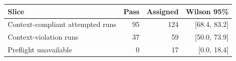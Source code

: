 \begin{tabular}{lrrr}
\toprule
\textbf{Slice} & \textbf{Pass} & \textbf{Assigned} & \textbf{Wilson 95\%} \\
\midrule
Context-compliant attempted runs & 95 & 124 & [68.4, 83.2] \\
Context-violation runs & 37 & 59 & [50.0, 73.9] \\
Preflight unavailable & 0 & 17 & [0.0, 18.4] \\
\bottomrule
\end{tabular}
